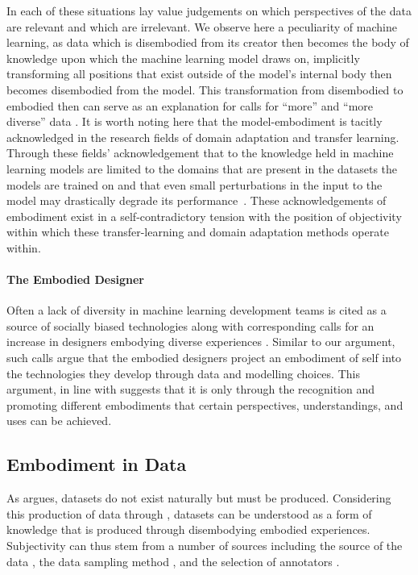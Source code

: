 In each of these situations lay value judgements on which perspectives of the data are relevant and which are irrelevant. We observe here a peculiarity of machine learning, as data which is disembodied from its creator then becomes the body of knowledge upon which the machine learning model draws on, implicitly transforming all positions that exist outside of the model's internal body then becomes disembodied from the model. This transformation from disembodied to embodied then can serve as an explanation for calls for ``more'' and ``more diverse'' data \cite{Holstein:2019}.
It is worth noting here that the model-embodiment is tacitly acknowledged in the research fields of domain adaptation \cite{Daume:2007} and transfer learning. Through these fields' acknowledgement that to the knowledge held in machine learning models are limited to the domains that are present in the datasets the models are trained on and that even small perturbations in the input to the model may drastically degrade its performance~\cite{Szegedy:2014,Daume:2007}. These acknowledgements of embodiment exist in a self-contradictory tension with the position of objectivity within which these transfer-learning and domain adaptation methods operate within.

\paragraph{The Embodied Designer}
Often a lack of diversity in machine learning development teams is cited as a source of socially biased technologies along with corresponding calls for an increase in designers embodying diverse experiences \cite{West:2019}. Similar to our argument, such calls argue that the embodied designers project an embodiment of self into the technologies they develop through data and modelling choices. This argument, in line with \citet{Haraway:1988} suggests that it is only through the recognition and promoting different embodiments that certain perspectives, understandings, and uses can be achieved.

\subsection{Embodiment in Data}
As \citet{Gitelman:2013} argues, datasets do not exist naturally but must be produced. Considering this production of data through \citet{Haraway:1988}, datasets can be understood as a form of knowledge that is produced through disembodying embodied experiences. Subjectivity can thus stem from a number of sources including the source of the data \cite{Gitelman-Jackson:2013}, the data sampling method \cite{Shah:2020}, and the selection of annotators \cite{Waseem:2016,Derczynski:2016}.

